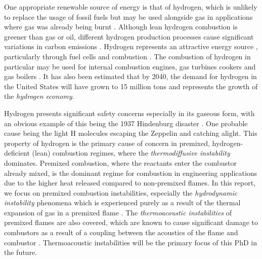 One appropriate renewable source of energy is that of hydrogen, which is unlikely to replace the usage of fossil fuels but may be used alongside gas in applications where gas was already being burnt \cite{momirlan2005PropertiesHydrogenFuel}. Although lean hydrogen combustion is greener than gas or oil, different hydrogen production processes \cite{dasilvaveras2017HydrogenTrendsProduction} cause significant variations in carbon emissions \cite{nationalgrid2022HeatingOurHomes}. Hydrogen represents an attractive energy source \cite{momirlan2005PropertiesHydrogenFuel}, particularly through fuel cells \cite{momirlan2005PropertiesHydrogenFuel} and combustion \cite{lanz2001Module3Hydrogen, stepien2021ComprehensiveOverviewHydrogenFueled}. The combustion of hydrogen in particular may be used for internal combustion engines, gas turbines cookers and gas boilers \cite{momirlan2005PropertiesHydrogenFuel}. It has also been estimated that by 2040, the demand for hydrogen in the United States will have grown to 15 million tons \cite{molkov2007HydrogenSafetyResearch} and represents the growth of the \emph{hydrogen economy}.

Hydrogen presents significant safety concerns \cite{green2006HydrogenSafetyIssues} especially in its gaseous form, with an obvious example of this being the 1937 Hindenburg disaster \cite{dilisi2017HindenburgDisasterCombining}. One probable cause being the light H molecules escaping the Zeppelin and catching alight. This property of hydrogen is the primary cause of concern in premixed, hydrogen-deficient (lean) combustion regimes, where the \emph{thermodiffusive instability} dominates. Premixed combustion, where the reactants enter the combustor already mixed, is the dominant regime for combustion in engineering applications due to the higher heat released compared to non-premixed flames. In this report, we focus on premixed combustion instabilities, especially the \emph{hydrodynamic instability} phenomena which is experienced purely as a result of the thermal expansion of gas in a premixed flame \cite{matalon2018DarrieusLandauInstability}. The \emph{thermoacoustic instabilities} of premixed flames are also covered, which are known to cause significant damage to combustors as a result of a coupling between the acoustics of the flame and combustor \cite{morgans2024ThermoacousticInstabilityCombustors}. Thermoacoustic instabilities will be the primary focus of this PhD in the future.

